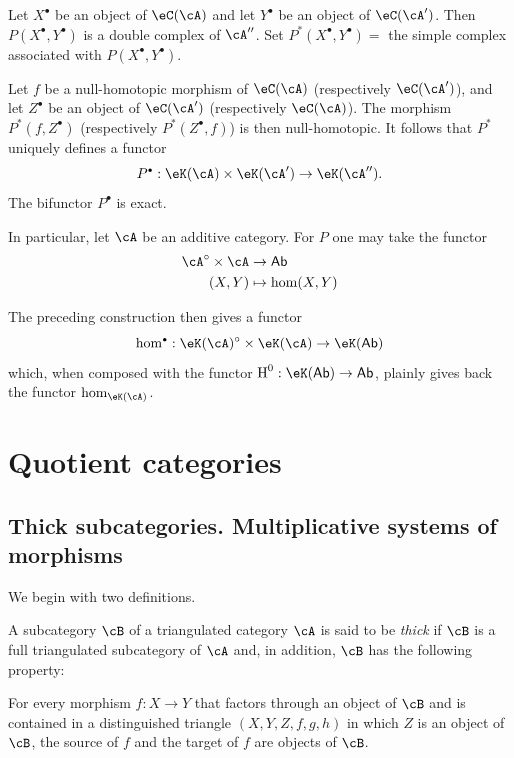 Let $X^\bullet$ be an object of $\eC(\cA)$ and let $Y^\bullet$ be an
object of $\eC(\cA')$. Then $P(X^\bullet,Y^\bullet)$ is a double complex
of $\cA''$. Set $P^\ast(X^\bullet,Y^\bullet) = $ the simple complex
associated with $P(X^\bullet,Y^\bullet)$.

Let $f$ be a null-homotopic morphism of $\eC(\cA)$ (respectively
$\eC(\cA')$), and let $Z^\bullet$ be an object of $\eC(\cA')$
(respectively $\eC(\cA)$). The morphism $P^\ast(f,Z^\bullet)$
(respectively $P^\ast(Z^\bullet,f)$) is then null-homotopic. It follows
that $P^\ast$ uniquely defines a functor
\[
  P^\bullet:\eK(\cA) \times \eK(\cA') \to \eK(\cA'') \text{.}
\]
The bifunctor $P^\bullet$ is exact.

In particular, let $\cA$ be an additive category. For $P$ one may take
the functor
\begin{align*}
  \cA^\circ\times \cA &\to \mathsf{Ab} \\
  (X,Y) &\mapsto \hom(X,Y)
\end{align*}

The preceding construction then gives a functor
\[
  \hom^\bullet:\eK(\cA)^\circ \times \eK(\cA) \to \eK(\mathsf{Ab})
\]
which, when composed with the functor
$\h^0:\eK(\mathsf{Ab})\to \mathsf{Ab}$, plainly gives back the functor
$\hom_{\eK(\cA)}$.

\section{Quotient categories}\label{VIII:2}

\subsection{Thick subcategories. Multiplicative systems of morphisms}\label{VIII:2-1}

We begin with two definitions.

\begin{definition}\label{VIII:2-1-1}
A subcategory $\cB$ of a triangulated category $\cA$ is said to be
\emph{thick} if $\cB$ is a full triangulated subcategory of $\cA$ and,
in addition, $\cB$ has the following property:

For every morphism $f:X\to Y$ that factors through an object of $\cB$ and
is contained in a distinguished triangle $(X,Y,Z,f,g,h)$ in which $Z$ is
an object of $\cB$, the source of $f$ and the target of $f$ are objects of
$\cB$.
\end{definition}

